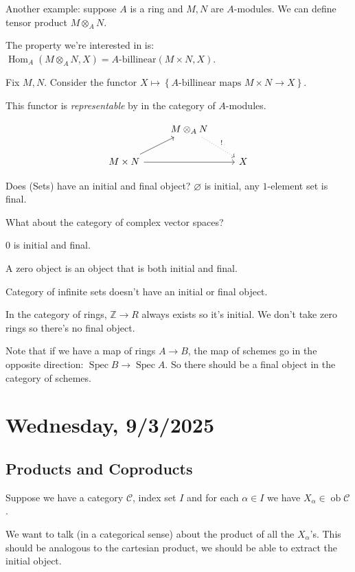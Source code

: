\documentclass{article}
\theoremstyle{definition}
\begin{document}
    Another example: suppose \(A\) is a ring and \(M,N\) are \(A\)-modules. We can define tensor product \(M \otimes_A N\).

    The property we're interested in is: \(\operatorname{Hom}_A (M \otimes_A N, X) = A \text{-billinear}(M \times N, X)\). 

    Fix \(M,N\). Consider the functor \(X \mapsto \left\{ A \text{-billinear maps } M \times N \to X \right\}\).

    This functor is \textit{representable} by in the category of \(A\)-modules.

    \[
        \begin{tikzcd}
            & M \otimes_A N \ar[rd,dotted, "!"] \\ M \times N \ar[rr] \ar[ur] && X
        \end{tikzcd}
    \]

    Does (Sets) have an initial and final object? \(\varnothing\) is initial, any \(1\)-element set is final.

    What about the category of complex vector spaces?

    \(0\) is initial and final.

    A zero object is an object that is both initial and final.

    Category of infinite sets doesn't have an initial or final object.

    In the category of rings, \(\mathbb{Z} \to R\) always exists so it's initial. We don't take zero rings so there's no final object.

    Note that if we have a map of rings \(A \to B\), the map of schemes go in the opposite direction: \(\operatorname{Spec} B \to \operatorname{Spec} A\). So there should be a final object in the category of schemes.

    \section*{Wednesday, 9/3/2025}
    
    \subsection*{Products and Coproducts}

    Suppose we have a category \(\mathcal{C}\), index set \(I\) and for each \(\alpha \in I\) we have \(X_\alpha \in \operatorname{ob} \mathcal{C}\).

    We want to talk (in a categorical sense) about the product of all the \(X_\alpha\)'s. This should be analogous to the cartesian product, we should be able to extract the initial object.
\end{document}
